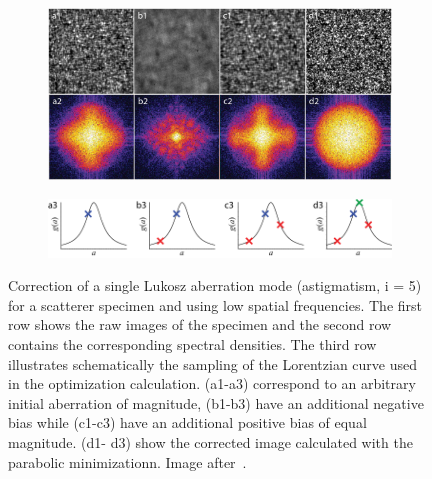 \begin{figure}[tbh]
			\centering
			\begin{subfigure}[b]{0.7\textwidth}
							\includegraphics[width=\textwidth]{images/wide_parabolic_opti_images}
							\label{fig:para_opt_images}
			\end{subfigure}
			\begin{subfigure}[b]{0.7\textwidth}
							\includegraphics[width=\textwidth]{images/wide_parabolic_opti_graphs}
							\label{fig:para_opt_graphs}
			\end{subfigure}								
			\caption{Correction of a single Lukosz aberration mode (astigmatism, i = 5) for a scatterer specimen and using low spatial frequencies. The first row shows the raw images of the specimen and the second row contains the corresponding spectral densities. The third row illustrates schematically the sampling of the Lorentzian curve used in the optimization calculation. (a1-a3) correspond to an arbitrary initial aberration of magnitude, (b1-b3) have an additional negative bias while (c1-c3) have an additional positive bias of equal magnitude. (d1- d3) show the corrected image calculated with the parabolic minimizationn. Image after~\cite{wide_AOM_loew_freq}.}
	\label{fig:para_opt}
\end{figure} 

